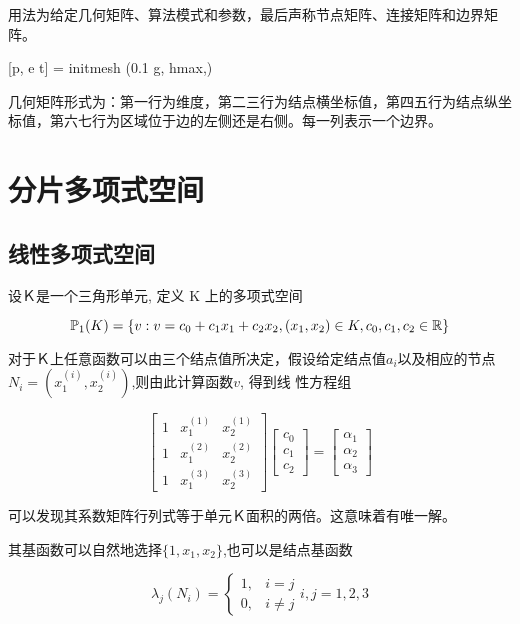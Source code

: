 \documentclass{article}
\begin{document}
用法为给定几何矩阵、算法模式和参数，最后声称节点矩阵、连接矩阵和边界矩阵。

[p, e t] = initmesh (0.1 g, hmax,)

几何矩阵形式为：第一行为维度，第二三行为结点横坐标值，第四五行为结点纵坐标值，第六七行为区域位于边的左侧还是右侧。每一列表示一个边界。

\section{分片多项式空间}
\subsection{线性多项式空间}
设Ｋ是一个三角形单元, 定义 K 上的多项式空间

\begin{equation}
    {\mathbb P}_1(K) = \{v: v = c_0 + c_1x_1 + c_2x_2, 
    (x_1, x_2) \in K, c_0, c_1, c_2 \in {\mathbb R}\}
\end{equation}

对于Ｋ上任意函数可以由三个结点值所决定，假设给定结点值$a_i$以及相应的节点 $N_i=(x_1^{(i)},x_2^{(i)})$,则由此计算函数$v$, 得到线
性方程组

\begin{equation}
\left[\begin{array}{ccc}
{1} & {x_{1}^{(1)}} & {x_{2}^{(1)}} \\
{1} & {x_{1}^{(2)}} & {x_{2}^{(2)}} \\
{1} & {x_{1}^{(3)}} & {x_{2}^{(3)}}
\end{array}\right]\left[\begin{array}{c}
{c_{0}} \\
{c_{1}} \\
{c_{2}}
\end{array}\right]=\left[\begin{array}{c}
{\alpha_{1}} \\
{\alpha_{2}} \\
{\alpha_{3}}
\end{array}\right]
\end{equation}

可以发现其系数矩阵行列式等于单元Ｋ面积的两倍。这意味着有唯一解。

其基函数可以自然地选择$\{1, x_1, x_2\}$,也可以是结点基函数

\begin{equation}
\lambda_{j}\left(N_{i}\right)=\left\{\begin{array}{ll}
{1,} & {i=j} \\
{0,} & {i \neq j}
\end{array} i, j=1,2,3\right.
\end{equation}
\end{document}
